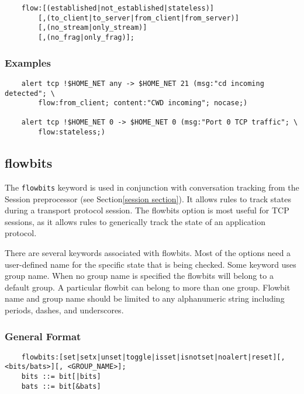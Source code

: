 \documentclass[english]{report}
\begin{document}
\begin{verbatim}
    flow:[(established|not_established|stateless)] 
        [,(to_client|to_server|from_client|from_server)]
        [,(no_stream|only_stream)]
        [,(no_frag|only_frag)];
\end{verbatim}

\subsubsection{Examples}

\begin{verbatim}
    alert tcp !$HOME_NET any -> $HOME_NET 21 (msg:"cd incoming detected"; \
        flow:from_client; content:"CWD incoming"; nocase;)

    alert tcp !$HOME_NET 0 -> $HOME_NET 0 (msg:"Port 0 TCP traffic"; \
        flow:stateless;)
\end{verbatim}

\subsection{flowbits}
\label{flowbits}

The \texttt{flowbits} keyword is used in conjunction with conversation tracking
from the Session preprocessor (see Section\ref{session section}).  It allows
rules to track states during a transport protocol session.  The flowbits option
is most useful for TCP sessions, as it allows rules to generically track the
state of an application protocol.

There are several keywords associated with flowbits. Most of the options need a
user-defined name for the specific state that is being checked.  Some keyword 
uses group name. When no group name is specified the flowbits will belong to a 
default group. A particular flowbit can belong to more than one group.
Flowbit name and group name should be limited to any alphanumeric string 
including periods, dashes, and underscores.

\subsubsection{General Format}

\begin{verbatim}
    flowbits:[set|setx|unset|toggle|isset|isnotset|noalert|reset][, <bits/bats>][, <GROUP_NAME>];
    bits ::= bit[|bits]
    bats ::= bit[&bats]
\end{verbatim}
\end{document}
